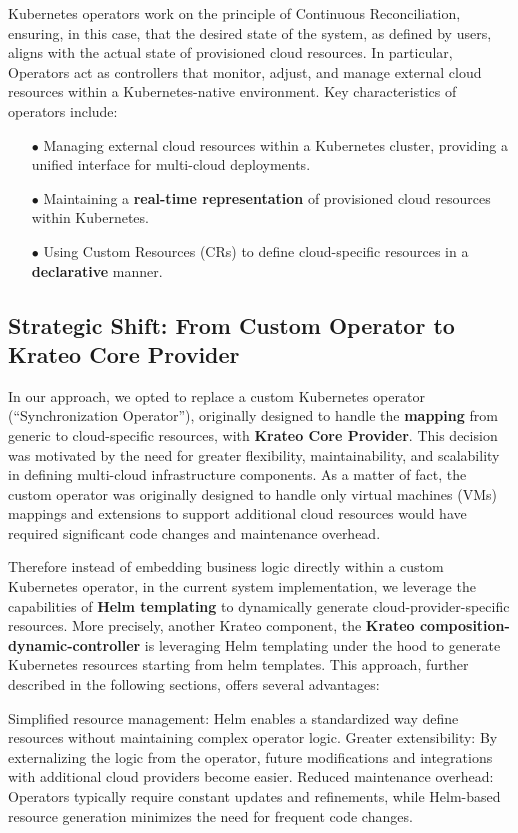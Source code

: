 Kubernetes operators work on the principle of Continuous Reconciliation, ensuring, in this case, that the desired state of the system, as defined by users, aligns with the actual state of provisioned cloud resources. In particular, Operators act as controllers that monitor, adjust, and manage external cloud resources within a Kubernetes-native environment.
Key characteristics of operators include:
\begin{itemize}[itemsep=0.2pt, topsep=1pt]
  \item[$\bullet$] Managing external cloud resources within a Kubernetes cluster, providing a unified interface for multi-cloud deployments.
  \item[$\bullet$] Maintaining a \textbf{real-time representation} of provisioned cloud resources within Kubernetes.
  \item[$\bullet$] Using Custom Resources (CRs) to define cloud-specific resources in a \textbf{declarative} manner.
\end{itemize}

\subsection{Strategic Shift: From Custom Operator to Krateo Core Provider}

In our approach, we opted to replace a custom Kubernetes operator (``Synchronization Operator''), originally designed to handle the \textbf{mapping} from generic to cloud-specific resources, with \textbf{Krateo Core Provider}. This decision was motivated by the need for greater flexibility, maintainability, and scalability in defining multi-cloud infrastructure components. As a matter of fact, the custom operator was originally designed to handle only virtual machines (VMs) mappings and extensions to support additional cloud resources would have required significant code changes and maintenance overhead.

Therefore instead of embedding business logic directly within a custom Kubernetes operator, in the current system implementation, we leverage the capabilities of \textbf{Helm templating} to dynamically generate cloud-provider-specific resources. More precisely, another Krateo component, the \textbf{Krateo composition-dynamic-controller} is leveraging Helm templating under the hood to generate Kubernetes resources starting from helm templates.
This approach, further described in the following sections, offers several advantages:

Simplified resource management:  Helm enables a standardized way define resources without maintaining complex operator logic.
Greater extensibility:  By externalizing the logic from the operator, future modifications and integrations with additional cloud providers become easier.
Reduced maintenance overhead: Operators typically require constant updates and refinements, while Helm-based resource generation minimizes the need for frequent code changes.


